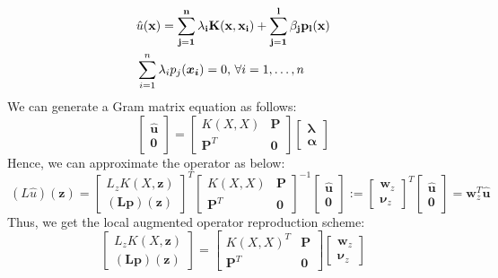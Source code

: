\documentclass[11pt]{article}
\begin{document}
\begin{align}
	&\hat{u}(\bf{x}) = \sum_{j=1}^n \lambda_i K(\bm{x}, \bm{x}_i) + \sum_{j=1}^l \beta_j p_l(\bf{x}) \\	
	&\sum_{i=1}^n \lambda_i p_j(\bm{x_i}) = 0 \text{, } \forall i=1,\hdots,n
\end{align}
We can generate a Gram matrix equation as follows:
\begin{equation*}
	\begin{bmatrix}
		\bm{\hat{u}} \\ \bm{0}
	\end{bmatrix} = 
	\begin{bmatrix}
		K(X,X) & \bm{P} \\
		\bm{P}^T & \bm{0}
	\end{bmatrix}
	\begin{bmatrix}
		\bm{\lambda} \\ \bm{\alpha}
	\end{bmatrix}
\end{equation*}
Hence, we can approximate the operator as below:
\begin{equation}\
	(L\hat{u})(\bm{z}) =
	\begin{bmatrix}
		L_z K(X, \bm{z}) \\ \bm{(Lp)(\bm{z})}
	\end{bmatrix}^T 
	\begin{bmatrix}
		K(X,X) & \bm{P} \\
		\bm{P}^T & \bm{0}
	\end{bmatrix}^{-1}
	\begin{bmatrix}
		\bm{\hat{u}} \\ \bm{0}
	\end{bmatrix} :=
	\begin{bmatrix}
		\bm{w}_z \\ \bm{\nu}_z
	\end{bmatrix}^T 
	\begin{bmatrix}
		\bm{\hat{u}} \\ \bm{0}
	\end{bmatrix} =
	\bm{w}^T_z \bm{\hat{u}}
	\label{eq:operator_approx}
\end{equation}
Thus, we get the local augmented operator reproduction scheme:
\begin{equation}
	\begin{bmatrix}
		L_z K(X, \bm{z}) \\ \bm{(Lp)(\bm{z})}
	\end{bmatrix} =
	\begin{bmatrix}
		K(X,X)^T & \bm{P} \\
		\bm{P}^T & \bm{0}
	\end{bmatrix} \begin{bmatrix}
		\bm{w}_z \\ \bm{\nu}_z
	\end{bmatrix}
	\label{eq:weight_solve}
\end{equation}
\end{document}
